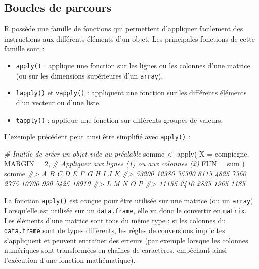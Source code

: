\documentclass[
  french,
]{scrbook}
\newenvironment{Shaded}{\begin{snugshade}}{\end{snugshade}}
\newcommand{\AttributeTok}[1]{\textcolor[rgb]{0.77,0.63,0.00}{#1}}
\newcommand{\CommentTok}[1]{\textcolor[rgb]{0.56,0.35,0.01}{\textit{#1}}}
\newcommand{\DecValTok}[1]{\textcolor[rgb]{0.00,0.00,0.81}{#1}}
\newcommand{\FunctionTok}[1]{\textcolor[rgb]{0.00,0.00,0.00}{#1}}
\newcommand{\NormalTok}[1]{#1}
\newcommand{\OtherTok}[1]{\textcolor[rgb]{0.56,0.35,0.01}{#1}}
\providecommand{\tightlist}{%
  \setlength{\itemsep}{0pt}\setlength{\parskip}{0pt}}
\begin{document}
\hypertarget{boucles-de-parcours}{%
\subsection{Boucles de parcours}\label{boucles-de-parcours}}

R possède une famille de fonctions qui permettent d'appliquer facilement des instructions aux différents éléments d'un objet. Les principales fonctions de cette famille sont :

\begin{itemize}
\tightlist
\item
  \texttt{apply()} : applique une fonction sur les lignes ou les colonnes d'une matrice (ou sur les dimensions supérieures d'un \texttt{array}).
\item
  \texttt{lapply()} et \texttt{vapply()} : appliquent une fonction sur les différents éléments d'un vecteur ou d'une liste.
\item
  \texttt{tapply()} : applique une fonction sur différents groupes de valeurs.
\end{itemize}

L'exemple précédent peut ainsi être simplifié avec \texttt{apply()} :

\begin{Shaded}
\begin{Highlighting}[]
\CommentTok{\# Inutile de créer un objet vide au préalable}
\NormalTok{somme }\OtherTok{\textless{}{-}} \FunctionTok{apply}\NormalTok{(}
  \AttributeTok{X =}\NormalTok{ compiegne, }
  \AttributeTok{MARGIN =} \DecValTok{2}\NormalTok{, }\CommentTok{\# Appliquer aux lignes (1) ou aux colonnes (2)}
  \AttributeTok{FUN =}\NormalTok{ sum}
\NormalTok{)}
\NormalTok{somme}
\CommentTok{\#\textgreater{}     A     B     C     D     E     F     G     H     I     J     K }
\CommentTok{\#\textgreater{} 53200 12380 35300  8115  4825  7360  2775 10700   990  5425 18910 }
\CommentTok{\#\textgreater{}     L     M     N     O     P }
\CommentTok{\#\textgreater{} 11155  2410  2835  1965  1185}
\end{Highlighting}
\end{Shaded}

\begin{tcolorbox}[fonttitle=\sffamily\bfseries\large,title=Avertissement,colframe=darkyellow]

La fonction \texttt{apply()} est conçue pour être utilisée sur une matrice (ou un \texttt{array}). Lorsqu'elle est utilisée sur un \texttt{data.frame}, elle va donc le convertir en \texttt{matrix}. Les éléments d'une matrice sont tous du même type : si les colonnes du \texttt{data.frame} sont de types différents, les règles de \protect\hyperlink{conversion}{conversions implicites} s'appliquent et peuvent entraîner des erreurs (par exemple lorsque les colonnes numériques sont transformées en chaînes de caractères, empêchant ainsi l'exécution d'une fonction mathématique).

\end{tcolorbox}
\end{document}

